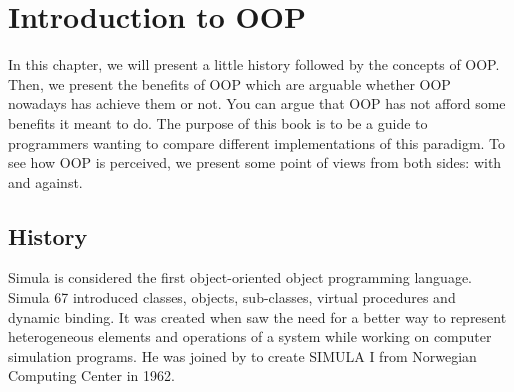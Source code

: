 \documentclass[12pt]{book}
\begin{document}
\fi

\chapter{Introduction to OOP}

\begin{introduction}
	In this chapter, we will present a little history followed by the concepts of OOP.
	Then, we present the benefits of OOP which are arguable whether OOP nowadays has achieve them or not. 
	You can argue that OOP has not afford some benefits it meant to do. 
	The purpose of this book is to be a guide to programmers wanting to compare different implementations of this paradigm. 
	To see how OOP is perceived, we present some point of views from both sides: with and against.
\end{introduction}

\section{History}

Simula is considered the first object-oriented object programming language. 
Simula 67 introduced classes, objects, sub-classes, virtual procedures and dynamic binding.
It was created when  saw the need for a better way to represent heterogeneous elements and operations of a system while working on computer simulation programs.
He was joined by  to create SIMULA I from Norwegian Computing Center in 1962.
\end{document}
